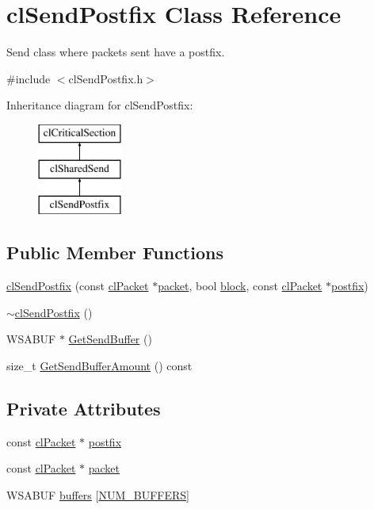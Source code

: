 \hypertarget{classcl_send_postfix}{
\section{clSendPostfix Class Reference}
\label{classcl_send_postfix}
}


Send class where packets sent have a postfix.  




{\ttfamily \#include $<$clSendPostfix.h$>$}

Inheritance diagram for clSendPostfix:\begin{figure}[H]
\begin{center}
\leavevmode
\includegraphics[height=3.000000cm]{classcl_send_postfix}
\end{center}
\end{figure}
\subsection*{Public Member Functions}
\begin{DoxyCompactItemize}
\item 
\hyperlink{classcl_send_postfix_ad95091de891752204293aa79d5591666}{clSendPostfix} (const \hyperlink{classcl_packet}{clPacket} $\ast$\hyperlink{classcl_send_postfix_a372780fa26eea19e710c6341f5633488}{packet}, bool \hyperlink{classcl_shared_send_aaaf411d2405cc3447a3bc11fe2ab2678}{block}, const \hyperlink{classcl_packet}{clPacket} $\ast$\hyperlink{classcl_send_postfix_accd15979eb11bf7e39b588537eb8e1b5}{postfix})
\item 
\hyperlink{classcl_send_postfix_a760cde356e6e10a6b466707c8bd5ad7b}{$\sim$clSendPostfix} ()
\item 
WSABUF $\ast$ \hyperlink{classcl_send_postfix_ace719e0f067b3f4cb0d8285fd0278ae9}{GetSendBuffer} ()
\item 
size\_\-t \hyperlink{classcl_send_postfix_ab2404132c3896b72c9cf0b695f858ed3}{GetSendBufferAmount} () const 
\end{DoxyCompactItemize}
\subsection*{Private Attributes}
\begin{DoxyCompactItemize}
\item 
const \hyperlink{classcl_packet}{clPacket} $\ast$ \hyperlink{classcl_send_postfix_accd15979eb11bf7e39b588537eb8e1b5}{postfix}
\item 
const \hyperlink{classcl_packet}{clPacket} $\ast$ \hyperlink{classcl_send_postfix_a372780fa26eea19e710c6341f5633488}{packet}
\item 
WSABUF \hyperlink{classcl_send_postfix_a8de5162b564e5a62ee4e78cd70413ce7}{buffers} \mbox{[}\hyperlink{classcl_send_postfix_a1243748bf3f0d732da1e59eed42068a1}{NUM\_\-BUFFERS}\mbox{]}
\end{DoxyCompactItemize}
